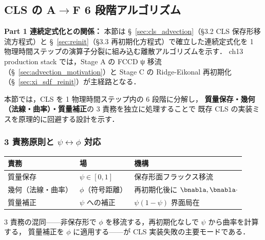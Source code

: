 %
%
\subsection{\texorpdfstring{CLS の A$\to$F 6 段階アルゴリズム}{CLS の A→F 6 段階アルゴリズム}}
\label{sec:cls_stages}

\noindent\textbf{Part 1 連続定式化との関係：}
本節は §~\ref{sec:cls_advection}（§3.2 CLS 保存形移流方程式）と
§~\ref{sec:reinit}（§3.3 再初期化方程式）で確立した連続定式化を
1 物理時間ステップの演算子分裂に組み込む離散アルゴリズムを示す．
ch13 production stack では，Stage A の FCCD ψ 移流
（§~\ref{sec:advection_motivation}）と Stage C の Ridge-Eikonal 再初期化
（§~\ref{sec:xi_sdf_reinit}）が主経路となる．

本節では，CLS \cite{OlssonKreiss2005} を 1 物理時間ステップ内の
6 段階に分解し，
\textbf{質量保存・幾何（法線・曲率）・質量補正}の
3 責務を独立に処理することで
既存 CLS の実装ミスを原理的に回避する設計を示す．

\subsubsection{\texorpdfstring{3 責務原則と $\psi\leftrightarrow\phi$ 対応}{3 責務原則と ψ↔φ 対応}}
\label{sec:cls_three_responsibilities}

\begin{center}
\begin{tabular}{@{}lll@{}}
\hline
責務 & 場 & 機構 \\
\hline
質量保存 & $\psi\in[0,1]$ & 保存形面フラックス移流 \\
幾何（法線・曲率）& $\phi$（符号距離）& 再初期化後に $\bnabla,\bnabla\cdot$ \\
質量補正 & $\psi$ への補正 & $\psi(1-\psi)$ 界面局在 \\
\hline
\end{tabular}
\end{center}

3 責務の混同——非保存形で $\phi$ を移流する，再初期化なしで $\psi$ から曲率を計算する，
質量補正を $\phi$ に適用する——が CLS 実装失敗の主要モードである．

